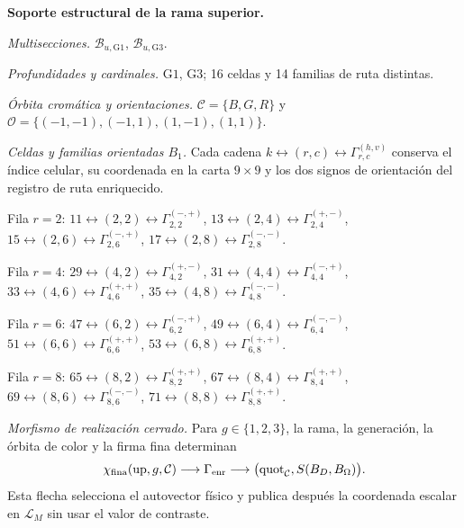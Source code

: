 \noindent\textbf{Soporte estructural de la rama superior.}\par
\noindent\textit{Multisecciones.} \(\mathcal B_{u,\mathrm{G1}}\), \(\mathcal B_{u,\mathrm{G3}}\).\par
\noindent\textit{Profundidades y cardinales.} $\mathrm{G1}$, $\mathrm{G3}$; 16 celdas y 14 familias de ruta distintas.\par
\noindent\textit{Órbita cromática y orientaciones.} $\mathcal C=\{B,G,R\}$ y $\mathcal O=\{(-1,-1),(-1,1),(1,-1),(1,1)\}$.\par
\noindent\textit{Celdas y familias orientadas $B_1$.} Cada cadena $k\leftrightarrow(r,c)\leftrightarrow\Gamma_{r,c}^{(h,v)}$ conserva el índice celular, su coordenada en la carta $9\times9$ y los dos signos de orientación del registro de ruta enriquecido.\par
\noindent Fila $r=2$: $11\leftrightarrow(2,2)\leftrightarrow\Gamma_{2,2}^{(-,+)}$, $13\leftrightarrow(2,4)\leftrightarrow\Gamma_{2,4}^{(+,-)}$, $15\leftrightarrow(2,6)\leftrightarrow\Gamma_{2,6}^{(-,+)}$, $17\leftrightarrow(2,8)\leftrightarrow\Gamma_{2,8}^{(-,-)}$.\par
\noindent Fila $r=4$: $29\leftrightarrow(4,2)\leftrightarrow\Gamma_{4,2}^{(+,-)}$, $31\leftrightarrow(4,4)\leftrightarrow\Gamma_{4,4}^{(-,+)}$, $33\leftrightarrow(4,6)\leftrightarrow\Gamma_{4,6}^{(+,+)}$, $35\leftrightarrow(4,8)\leftrightarrow\Gamma_{4,8}^{(-,-)}$.\par
\noindent Fila $r=6$: $47\leftrightarrow(6,2)\leftrightarrow\Gamma_{6,2}^{(-,+)}$, $49\leftrightarrow(6,4)\leftrightarrow\Gamma_{6,4}^{(-,-)}$, $51\leftrightarrow(6,6)\leftrightarrow\Gamma_{6,6}^{(+,+)}$, $53\leftrightarrow(6,8)\leftrightarrow\Gamma_{6,8}^{(+,+)}$.\par
\noindent Fila $r=8$: $65\leftrightarrow(8,2)\leftrightarrow\Gamma_{8,2}^{(+,+)}$, $67\leftrightarrow(8,4)\leftrightarrow\Gamma_{8,4}^{(+,+)}$, $69\leftrightarrow(8,6)\leftrightarrow\Gamma_{8,6}^{(-,-)}$, $71\leftrightarrow(8,8)\leftrightarrow\Gamma_{8,8}^{(+,+)}$.\par
\noindent\textit{Morfismo de realización cerrado.} Para $g\in\{1,2,3\}$, la rama, la generación, la órbita de color y la firma fina determinan
\[\chi_{\rm fina}(\operatorname{up},g,\mathcal C)\longrightarrow\Gamma_{\rm enr}\longrightarrow\bigl(\operatorname{quot}_{\mathcal C},S(B_D,B_\Omega)\bigr).\]
Esta flecha selecciona el autovector físico y publica después la coordenada escalar en $\mathcal L_M$ sin usar el valor de contraste.\par
